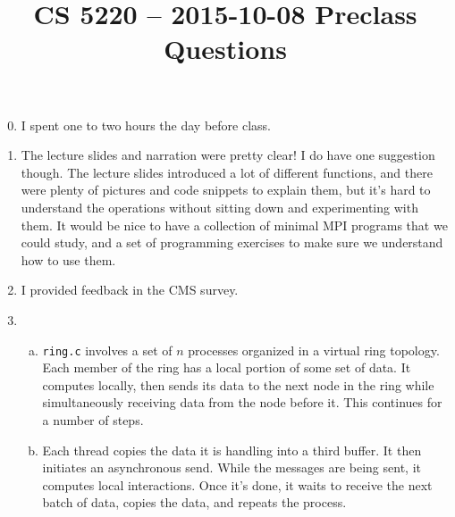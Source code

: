 \documentclass{hw}
\title{CS 5220 -- 2015-10-08 Preclass Questions}
\begin{document}
\maketitle{}

\begin{enumerate}
  \setcounter{enumi}{-1}
  \item
    I spent one to two hours the day before class.

  \item
    The lecture slides and narration were pretty clear! I do have one
    suggestion though. The lecture slides introduced a lot of different
    functions, and there were plenty of pictures and code snippets to explain
    them, but it's hard to understand the operations without sitting down and
    experimenting with them. It would be nice to have a collection of minimal
    MPI programs that we could study, and a set of programming exercises to
    make sure we understand how to use them.

  \item
    I provided feedback in the CMS survey.

  \item
    \begin{enumerate}[(a)]
      \item
        \texttt{ring.c} involves a set of $n$ processes organized in a virtual
        ring topology. Each member of the ring has a local portion of some set
        of data. It computes locally, then sends its data to the next node in
        the ring while simultaneously receiving data from the node before it.
        This continues for a number of steps.

      \item
        Each thread copies the data it is handling into a third buffer. It then
        initiates an asynchronous send. While the messages are being sent, it
        computes local interactions. Once it's done, it waits to receive the
        next batch of data, copies the data, and repeats the process.
    \end{enumerate}
\end{enumerate}
\end{document}
